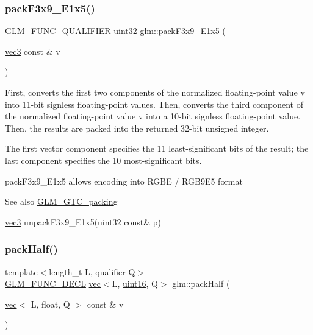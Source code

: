 \subsubsection{\texorpdfstring{pack\+F3x9\+\_\+\+E1x5()}{packF3x9\_E1x5()}}
{\footnotesize\ttfamily \hyperlink{setup_8hpp_a33fdea6f91c5f834105f7415e2a64407}{G\+L\+M\+\_\+\+F\+U\+N\+C\+\_\+\+Q\+U\+A\+L\+I\+F\+I\+ER} \hyperlink{group__gtc__type__precision_ga202b6a53c105fcb7e531f9b443518451}{uint32} glm\+::pack\+F3x9\+\_\+\+E1x5 (\begin{DoxyParamCaption}\item[{\hyperlink{group__core__types_ga1c47e8b3386109bc992b6c48e91b0be7}{vec3} const \&}]{v }\end{DoxyParamCaption})}

First, converts the first two components of the normalized floating-\/point value v into 11-\/bit signless floating-\/point values. Then, converts the third component of the normalized floating-\/point value v into a 10-\/bit signless floating-\/point value. Then, the results are packed into the returned 32-\/bit unsigned integer.

The first vector component specifies the 11 least-\/significant bits of the result; the last component specifies the 10 most-\/significant bits.

pack\+F3x9\+\_\+\+E1x5 allows encoding into R\+G\+BE / R\+G\+B9\+E5 format

\begin{DoxySeeAlso}{See also}
\hyperlink{group__gtc__packing}{G\+L\+M\+\_\+\+G\+T\+C\+\_\+packing} 

\hyperlink{group__core__types_ga1c47e8b3386109bc992b6c48e91b0be7}{vec3} unpack\+F3x9\+\_\+\+E1x5(uint32 const\& p) 
\end{DoxySeeAlso}
\mbox{\label{group__gtc__packing_ga2d8bbce673ebc04831c1fb05c47f5251}} 
\subsubsection{\texorpdfstring{pack\+Half()}{packHalf()}}
{\footnotesize\ttfamily template$<$length\+\_\+t L, qualifier Q$>$ \\
\hyperlink{setup_8hpp_ab2d052de21a70539923e9bcbf6e83a51}{G\+L\+M\+\_\+\+F\+U\+N\+C\+\_\+\+D\+E\+CL} \hyperlink{structglm_1_1vec}{vec}$<$L, \hyperlink{group__gtc__type__precision_gad8c2939e1fdd8e5828b31d95c52255d5}{uint16}, Q$>$ glm\+::pack\+Half (\begin{DoxyParamCaption}\item[{\hyperlink{structglm_1_1vec}{vec}$<$ L, float, Q $>$ const \&}]{v }\end{DoxyParamCaption})}

